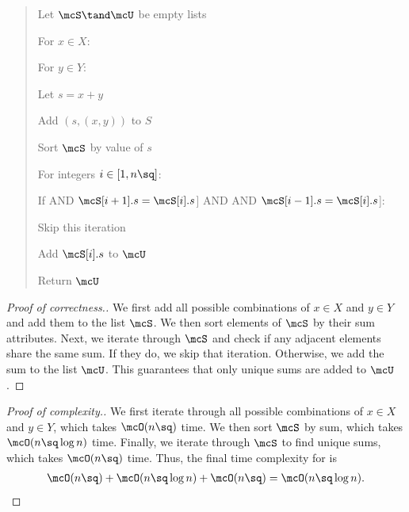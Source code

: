 \documentclass[10pt]{article}
\begin{document}
\begin{quote}


\begin{steps}
  \item Let \( \mcS \tand \mcU \) be empty lists
  \item For \( x \in X \): 
  \begin{steps}
    \item For \( y \in Y \): 
    \begin{steps}
      \item Let \( s = x+y \)
      \item Add \( (s, (x,y)) \) to \( S \)
    \end{steps}
  \end{steps}
  \item Sort \( \mcS \) by value of \( s \) 
  \item For integers \( i\in [1,n\sq] \):
  \begin{steps}
    \item If \Big[\( \exists\mcS[i+1] \) AND \( \mcS[i+1].s = \mcS[i].s \)\Big] AND \Big[ \( \exists\mcS[i-1] \) AND \( \mcS[i-1].s = \mcS[i].s \)\Big]:
    \begin{steps}
      \item Skip this iteration
    \end{steps}
    \item Add \( \mcS[i].s \) to \( \mcU \)
  \end{steps}
  \item Return \( \mcU \)
\end{steps}
\end{quote}

\begin{proof}[Proof of correctness.]
We first add all possible combinations of \( x\in X \) and \( y\in Y \) and add them to the list \( \mcS \). We then sort elements of \( \mcS \) by their sum attributes. Next, we iterate through \( \mcS \) and check if any adjacent elements share the same sum. If they do, we skip that iteration. Otherwise, we add the sum to the list \( \mcU \). This guarantees that only unique sums are added to \( \mcU \).
\end{proof}

\begin{proof}[Proof of complexity.]
We first iterate through all possible combinations of \( x\in X \) and \( y\in Y \), which takes \( \mcO(n\sq) \) time. We then sort \( \mcS \) by sum, which takes \( \mcO(n\sq \log n) \) time. Finally, we iterate through \( \mcS \) to find unique sums, which takes \( \mcO(n\sq) \) time. Thus, the final time complexity for  is \begin{align*}
  \mcO(n\sq) + \mcO(n\sq \log n) + \mcO(n\sq) = \mcO(n\sq\log n).
\end{align*}
\end{proof}
\pagebreak
\end{document}
